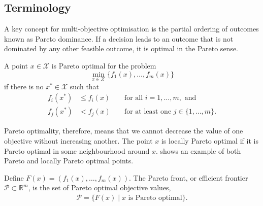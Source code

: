 \documentclass[main.tex]{subfiles}
\begin{document}
\subsection{Terminology}\label{sec:multi_terminology}
A key concept for multi-objective optimisation is the partial
ordering of outcomes known as Pareto dominance. If a decision leads to
an outcome that is not dominated by any other feasible outcome, it is
optimal in the Pareto sense.
\begin{mydef}
  A point $x\in\mathcal{X}$ is Pareto optimal for the problem
  \begin{equation}
    \min_{x\in\mathcal{X}}\{f_1(x),\dots,f_m(x)\}
  \end{equation}
  if there is no
  $x^*\in\mathcal{X}$ such that
  \begin{align}
    f_i(x^*)&\leq f_i(x) &&\text{ for all } i = 1,\dots,m, \text{ and}\\
    f_j(x^*)&<f_j(x) &&\text{ for at least one } j \in \{1,\dots,m\}.
  \end{align}
\end{mydef}
Pareto optimality, therefore, means that we cannot decrease the value of
one objective without increasing another.
The point $x$ is locally Pareto optimal if it is Pareto optimal in
some neighbourhood around $x$. 
shows an example of both Pareto and locally Pareto optimal points.
\begin{mydef}
  Define $F(x) = (f_1(x),\dots,f_m(x))$.
  The Pareto front, or efficient frontier $\mathcal{P}\subset
  \mathbb{R}^m$, is the set of
  Pareto optimal objective values,
  \begin{align}
    \mathcal{P} = \{F(x) \mid x \text{ is Pareto optimal}\}.
  \end{align}
\end{mydef}
\end{document}
